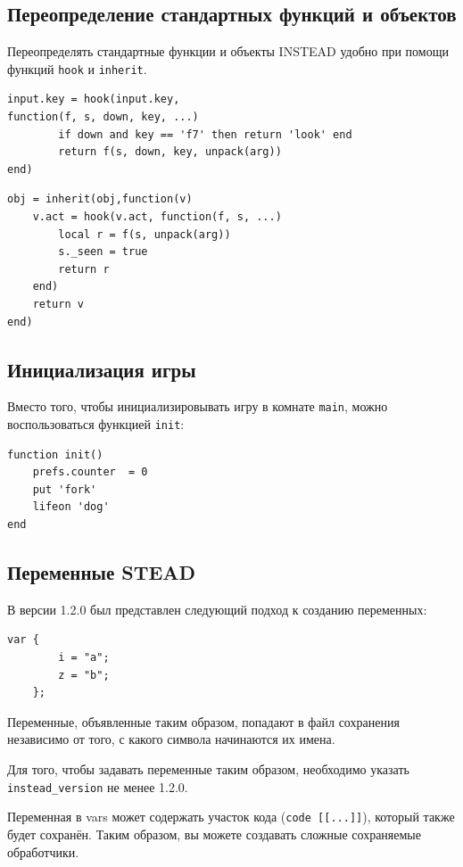\documentclass[12pt]{article}
\begin{document}
\subsection{Переопределение стандартных функций и объектов}


Переопределять стандартные функции и объекты INSTEAD удобно при помощи функций \verb/hook/ и \verb/inherit/.

\begin{verbatim}
input.key = hook(input.key,
function(f, s, down, key, ...)
        if down and key == 'f7' then return 'look' end
        return f(s, down, key, unpack(arg))
end)
\end{verbatim}
\begin{verbatim}
obj = inherit(obj,function(v)
    v.act = hook(v.act, function(f, s, ...)
        local r = f(s, unpack(arg))
        s._seen = true
        return r
    end)
    return v
end)
\end{verbatim}
\subsection{Инициализация игры}
Вместо того, чтобы инициализировывать игру в комнате \verb/main/, можно воспользоваться функцией \verb/init/:
\begin{verbatim}
function init()
    prefs.counter  = 0
    put 'fork'
    lifeon 'dog'
end
\end{verbatim}
\subsection{Переменные STEAD}
В версии 1.2.0 был представлен следующий подход к созданию переменных:

\begin{verbatim}
var {
        i = "a";
        z = "b";
    };
\end{verbatim}

Переменные, объявленные таким образом, попадают в файл сохранения независимо от того, с какого символа начинаются их имена.

Для того, чтобы задавать переменные таким образом, необходимо указать \verb/instead_version/ не менее 1.2.0.

Переменная в vars может содержать участок кода (\verb/code [[...]]/), который также будет сохранён. Таким образом, вы можете создавать сложные сохраняемые обработчики.
\end{document}
